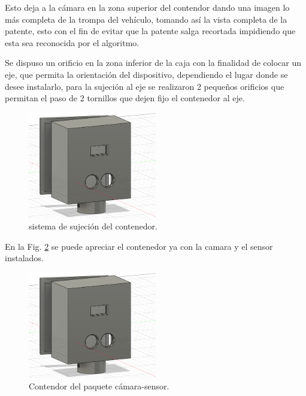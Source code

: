 Esto deja a la cámara en la zona superior del contendor dando una imagen lo más completa de la trompa del vehículo, tomando así la vista
completa de la patente, esto con el fin de evitar que la patente salga recortada impidiendo que esta sea reconocida por el algoritmo.

Se dispuso un orificio en la zona inferior de la caja con la finalidad de colocar un eje, que permita la orientación del dispositivo, dependiendo
el lugar donde se desee instalarlo, para la sujeción al eje se realizaron 2 pequeños orificios que permitan el paso de 2 tornillos que dejen fijo
el contenedor al eje.
\begin{figure}
    \centering
    \includegraphics[width=0.5\textwidth]{imgs/contenedor-camara.png}
    \caption{sistema de sujeción del contenedor.}
    \label{fig:sujecion-contenedor}
\end{figure}

En la Fig. \ref{fig:contenedor-camara-real} se puede apreciar el contenedor ya con la camara y el sensor instalados.

\begin{figure}
    \centering
    \includegraphics[width=0.5\textwidth]{imgs/contenedor-camara.png}
    \caption{Contendor del paquete cámara-sensor.}
    \label{fig:contenedor-camara-real}
\end{figure}

